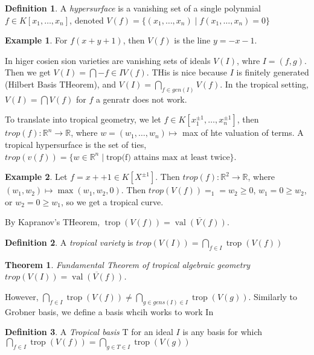 \documentclass[11pt]{article}
\newtheorem{prototheorem}{Theorem}[section]
\newenvironment{theorem}
   {\begin{prototheorem}}
   {\end{prototheorem}}
\theoremstyle{definition}
\newtheorem{protoexample}{Example}[section]
\newenvironment{ex}
   {\begin{protoexample}}
   {\end{protoexample}}
\newtheorem{protodefinition}{Definition}[section]
\newenvironment{define}
   {\begin{protodefinition}}
   {\end{protodefinition}}
\def\RR{{\mathbb R}}
\DeclareMathOperator{\val}{val}
\DeclareMathOperator{\trop}{trop}
\begin{document}
\begin{define}
A \emph{hypersurface} is a vanishing set of a single polynmial $f \in K[x_1, \dots, x_n]$, denoted $V(f) = \{(x_1, \dots, x_n) \; |\; f(x_1, \dots, x_n)=0\}$
\end{define}

\begin{ex}
    For $f(x+y+1)$, then $V(f)$ is the line $y=-x-1$.
\end{ex}



In higer cosien sion varieties are vanishing sets of ideals $V(I)$, whre $I=(f,g)$. Then we get $V(I)= \bigcap\limits-{f \in I} V(f)$. THis is nice because $I$ is finitely generated (Hilbert Basis THeorem), and $V(I) = \bigcap\limits_{f \in gen(I)} V(f)$. In the tropical setting, $V(I) = \bigcap V(f)$ for $f$ a genratr does not work.


To translate into tropical geometry, we let $f \in K[x_1^{\pm1}, \dots, x_n^{\pm1}]$, then$ trop(f):\RR^n \rightarrow \RR$, where $w=(w_1, \dots, w_n) \mapsto$ max of hte valuation of terms. A tropical hypersurface is the set of ties, $trop(v(f)) = \{w \in \RR^n \; |\; \text{trop(f) attains max at least twice}\}$.




\begin{ex}
Let $f=x++1 \in K[X^{\pm1}]$. Then $trop(f) :\RR^2\rightarrow \RR$, where $(w_1,w_2) \mapsto \max(w_1,w_2, 0)$. Then $trop(V(f))= _1=w_2\geq 0$, $w_1=0\geq w_2$, or $w_2 = 0 \geq w_1$, so we get a tropical curve. 
\end{ex}

By Kapranov's THeorem, $\trop(V(f)) = \overline{\val(V(f))}$.

\begin{define}
A \emph{tropical variety} is $trop(V(I))= \bigcap\limits_{f \in I} \trop(V(f))$
\end{define}


\begin{theorem}{Fundamental Theorem of tropical algebraic geometry}
    $trop(V(I))= \overline{\val(V(f))}$.
\end{theorem}

However, $\bigcap\limits_{f \in I} \trop(V(f)) \neq \bigcap\limits_{g \in gens(I) \in I} \trop(V(g))$. Similarly to Grobner basis, we define a basis whcih works to work In

\begin{define}
    A \emph{Tropical basis} T for an ideal $I$ is any basis for which $\bigcap\limits_{f \in I} \trop(V(f)) = \bigcap\limits_{g \in T \in I} \trop(V(g))$
\end{define}
\end{document}
